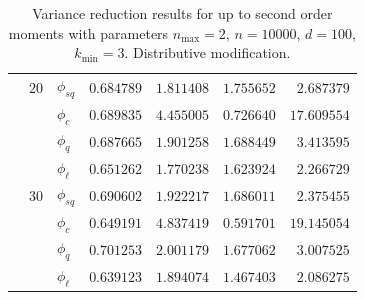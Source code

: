 \begin{table}[htb]
{\begin{tabular}{l@{\hskip 12pt}l@{\hskip 12pt}l@{\hskip
      12pt}r@{\hskip 12pt}r@{\hskip 12pt}r@{\hskip 12pt}r}
      & $20$ &$\phi_{sq}$ &  $0.684789$ &  $1.811408$ &    $1.755652$
      &   $2.687379$ \\
      &    &$\phi_{c}$ &  $0.689835$ &  $4.455005$ &    $0.726640$ &
      $17.609554$ \\
      &    &$\phi_{q}$ &  $0.687665$ &  $1.901258$ &    $1.688449$ &
      $3.413595$ \\
      &    &$\phi_{\ell}$ &  $0.651262$ &  $1.770238$ &    $1.623924$
      &   $2.266729$ \\\cmidrule{2-7}
      & $30$ &$\phi_{sq}$ &  $0.690602$ &  $1.922217$ &    $1.686011$
      &   $2.375455$ \\
      &    &$\phi_{c}$ &  $0.649191$ &  $4.837419$ &    $0.591701$ &
      $19.145054$ \\
      &    &$\phi_{q}$ &  $0.701253$ &  $2.001179$ &    $1.677062$ &
      $3.007525$ \\
      &    &$\phi_{\ell}$ &  $0.639123$ &  $1.894074$ &    $1.467403$
      &   $2.086275$ \\
      \bottomrule
  \end{tabular}}
  \caption[Variance reduction results for up to second order
  moments]{Variance reduction results for up to second order moments
    with parameters $n_{\max}=2$, $n=\num{10000}$, $d=100$,
  $k_{\min}=3$. Distributive modification.}
  \label{tab:eff2}
\end{table}

